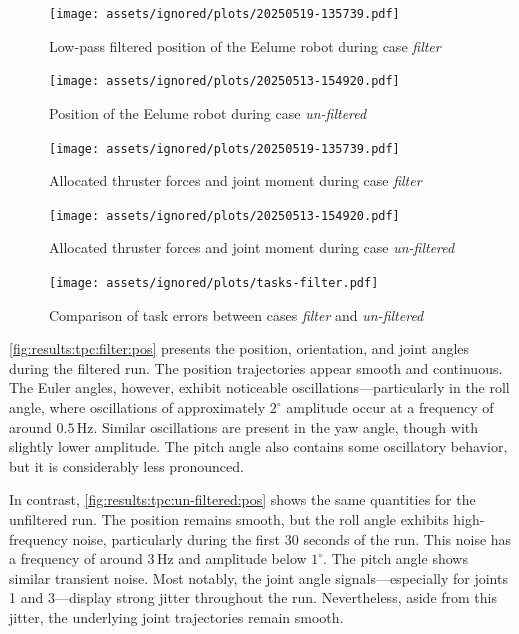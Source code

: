 \begin{figure}[h!]
    \centering
    \texttt{[image: assets/ignored/plots/20250519-135739.pdf]}
    \caption{Low-pass filtered position of the Eelume robot during case \textit{filter}}
    \label{fig:results:tpc:filter:pos}
\end{figure}
\begin{figure}[h!]
    \centering
    \texttt{[image: assets/ignored/plots/20250513-154920.pdf]}
    \caption{Position of the Eelume robot during case \textit{un-filtered}}
    \label{fig:results:tpc:un-filtered:pos}
\end{figure}
\begin{figure}[h!]
    \centering
    \texttt{[image: assets/ignored/plots/20250519-135739.pdf]}
    \caption{Allocated thruster forces and joint moment during case \textit{filter}}
    \label{fig:results:tpc:filter:forces}
\end{figure}
\begin{figure}[h!]
    \centering
    \texttt{[image: assets/ignored/plots/20250513-154920.pdf]}
    \caption{Allocated thruster forces and joint moment during case \textit{un-filtered}}
    \label{fig:results:tpc:un-filtered:forces}
\end{figure}
\begin{figure}[h!]
    \centering
    \texttt{[image: assets/ignored/plots/tasks-filter.pdf]}
    \caption{Comparison of task errors between cases \textit{filter} and \textit{un-filtered}}
    \label{fig:results:tpc:filter:task-errors}
\end{figure}

\autoref{fig:results:tpc:filter:pos} presents the position, orientation, and joint angles during the filtered run. The position trajectories appear smooth and continuous. The Euler angles, however, exhibit noticeable oscillations—particularly in the roll angle, where oscillations of approximately \(2^\circ\) amplitude occur at a frequency of around \(0.5\,\mathrm{Hz}\). Similar oscillations are present in the yaw angle, though with slightly lower amplitude. The pitch angle also contains some oscillatory behavior, but it is considerably less pronounced.

In contrast, \autoref{fig:results:tpc:un-filtered:pos} shows the same quantities for the unfiltered run. The position remains smooth, but the roll angle exhibits high-frequency noise, particularly during the first 30 seconds of the run. This noise has a frequency of around \(3\,\mathrm{Hz}\) and amplitude below \(1^\circ\). The pitch angle shows similar transient noise. Most notably, the joint angle signals—especially for joints 1 and 3—display strong jitter throughout the run. Nevertheless, aside from this jitter, the underlying joint trajectories remain smooth.

